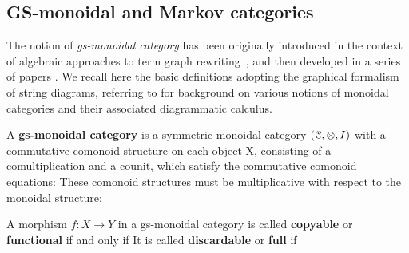 \documentclass[a4paper,UKenglish,numberwithinsect,cleveref, autoref, thm-restate]{lipics-v2021}
\theoremstyle{plain} %
\theoremstyle{definition} %
\begin{document}
\subsection{GS-monoidal and Markov categories}

The notion of \emph{gs-monoidal category} has been originally introduced in the context of algebraic approaches to term graph rewriting~\cite{CorradiniGadducci97}, and then
developed in a series of papers \cite{CorradiniGadducci99, CorradiniGadducci02, CorradiniGadducci99b}.
We recall here the basic definitions adopting the graphical formalism of string diagrams,
%
%
referring to \cite{Selinger2011} for background on various notions of monoidal categories and their associated diagrammatic calculus.


\begin{definition}
A \textbf{gs-monoidal category} is a symmetric monoidal category $(\mathcal{C}, \otimes, I)$
with a commutative comonoid structure on each object X, consisting of a comultiplication
and a counit,
which satisfy the commutative comonoid equations:
These comonoid structures must be multiplicative with respect to the monoidal structure:

\end{definition}



\begin{definition}
 A morphism $f:X\to Y$ in a gs-monoidal category is called \textbf{copyable} or \textbf{functional} if and only if
 It is called \textbf{discardable} or \textbf{full} if 
\end{definition}
\end{document}
